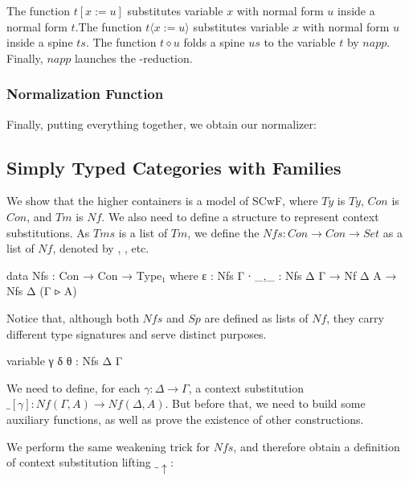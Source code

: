 The function $t [ x := u ]$ substitutes variable $x$ with normal form $u$ inside a normal form $t$.The function $t \langle x := u \rangle$ substitutes variable $x$ with normal form $u$ inside a spine $ts$. The function $t \diamond u$ folds a spine $us$ to the variable $t$ by $napp$. Finally, $napp$ launches the \beta-reduction.

\subsubsection*{Normalization Function}

Finally, putting everything together, we obtain our normalizer:


\subsection{Simply Typed Categories with Families}

We show that the higher containers is a model of SCwF, where $Ty$ is $Ty$, $Con$ is $Con$, and $Tm$ is $Nf$. We also need to define a structure to represent context substitutions. As $Tms$ is a list of $Tm$, we define the $Nfs : Con \to Con \to Set$ as a list of $Nf$, denoted by \gamma, \delta, etc.

\begin{code}
data Nfs : Con → Con → Type₁ where
  ε   : Nfs Γ ∙
  _,_ : Nfs Δ Γ → Nf Δ A → Nfs Δ (Γ ▹ A)
\end{code}

Notice that, although both $Nfs$ and $Sp$ are defined as lists of $Nf$, they carry different type signatures and serve distinct purposes.

\begin{code}[hide]
variable γ δ θ : Nfs Δ Γ
\end{code}

We need to define, for each $\gamma : \Delta \to \Gamma$, a context substitution $\_[\gamma] : Nf(\Gamma,A) \to Nf(\Delta,A)$. But before that, we need to build some auxiliary functions, as well as prove the existence of other constructions.

We perform the same weakening trick for $Nfs$, and therefore obtain a definition of context substitution lifting $\_\uparrow$:

